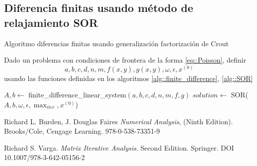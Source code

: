 \documentclass[a4paper]{article}
\begin{document}
\subsection{Diferencia finitas usando método de relajamiento SOR}
\begin{algorithm}
\caption{Algoritmo diferencias finitas usando generalización factorización de Crout}\label{alg::finite_diff_Crout}
Dado un problema con condiciones de frontera de la forma \ref{eq::Poisson}, definir
\begin{equation*}
a,b,c,d,n,m,f(x,y),g(x,y),\omega,\epsilon,x^{(0)}
\end{equation*}
usando las funciones definidas en los algoritmos \ref{alg::finite_difference}, \ref{alg::SOR}
\begin{algorithmic}
\State $A, b\gets$ finite\_difference\_linear\_system$(a,b,c,d,n,m,f,g)$
\State $solution\gets $ SOR($A,b,\omega,\epsilon,\max_{iter},x^{(0)}$)
\end{algorithmic}
\end{algorithm}
\begin{thebibliography}{99}


 Richard L. Burden, J. Douglas Faires \textit{Numerical Analysis}, (Ninth Edition). Brooks/Cole, Cengage Learning. 978-0-538-73351-9

 Richard S. Varga. \textit{Matrix Iterative Analysis}. Second Edition. Springer. DOI 10.1007/978-3-642-05156-2






\end{thebibliography}
\end{document}
